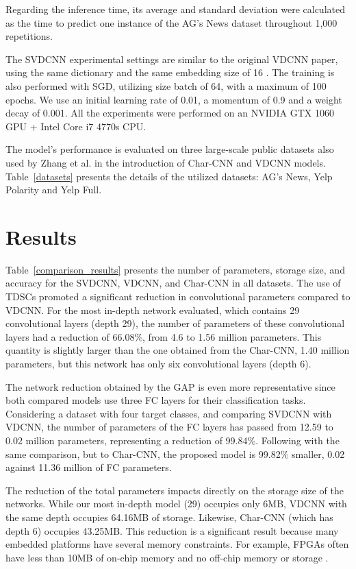 \documentclass[conference]{IEEEtran}
\begin{document}
Regarding the inference time, its average and standard deviation were calculated as the time to predict one instance of the AG's News dataset throughout 1,000 repetitions. 

The SVDCNN experimental settings are similar to the original VDCNN paper, using the same dictionary and the same embedding size of 16 \cite{conneau2016very}.  The training is also performed with SGD, utilizing size batch of 64, with a maximum of 100 epochs. We use an initial learning rate of 0.01, a momentum of 0.9 and a weight decay of 0.001.  All the experiments were performed on an NVIDIA GTX 1060 GPU + Intel Core i7 4770s CPU.

The model's performance is evaluated on three large-scale public datasets also used by Zhang et al. \cite{zhang2015character} in the introduction of Char-CNN and VDCNN models. Table~\ref{datasets} presents the details of the utilized datasets: AG's News, Yelp Polarity and Yelp Full.

\section{Results}

Table~\ref{comparison_results} presents the number of parameters, storage size, and accuracy for the SVDCNN, VDCNN, and Char-CNN in all datasets. The use of TDSCs promoted a significant reduction in convolutional parameters compared to VDCNN. For the most in-depth network evaluated, which contains 29 convolutional layers (depth 29), the number of parameters of these convolutional layers had a reduction of 66.08\%, from 4.6 to 1.56 million parameters. This quantity is slightly larger than the one obtained from the Char-CNN, 1.40 million parameters, but this network has only six convolutional layers (depth 6).

The network reduction obtained by the GAP is even more representative since both compared models use three FC layers for their classification tasks. Considering a dataset with four target classes, and comparing SVDCNN with VDCNN, the number of parameters of the FC layers has passed from 12.59 to 0.02 million parameters, representing a reduction of 99.84\%.  Following with the same comparison, but to Char-CNN, the proposed model is 99.82\% smaller, 0.02 against 11.36 million of FC parameters.

The reduction of the total parameters impacts directly on the storage size of the networks. While our most in-depth model (29) occupies only 6MB, VDCNN with the same depth occupies 64.16MB of storage. Likewise, Char-CNN (which has depth 6) occupies 43.25MB. This reduction is a significant result because many embedded platforms have several memory constraints. For example, FPGAs often have less than 10MB of on-chip memory and no off-chip memory or storage \cite{howard2017mobilenets}.
\end{document}
